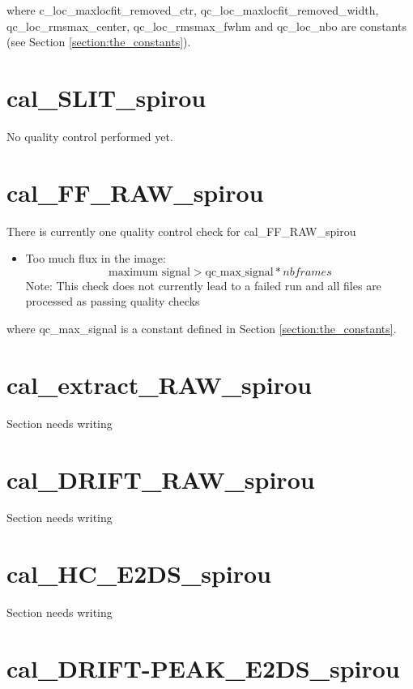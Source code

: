 \noindent where c\_loc\_maxlocfit\_removed\_ctr, qc\_loc\_maxlocfit\_removed\_width, qc\_loc\_rmsmax\_center, qc\_loc\_rmsmax\_fwhm and qc\_loc\_nbo are constants (see Section \ref{section:the_constants}).

\section{cal\_SLIT\_spirou}
\label{section:qc_cal_SLIT_spirou}

No quality control performed yet.

\section{cal\_FF\_RAW\_spirou}
\label{section:qc_cal_FF_RAW_spirou}

There is currently one quality control check for cal\_FF\_RAW\_spirou
\begin{itemize}
\item Too much flux in the image: 
	\begin{equation}
	\text{maximum signal} > \text{qc\_max\_signal} * nbframes
	\end{equation}
	\noindent Note: This check does not currently lead to a failed run and all files are processed as passing quality checks
\end{itemize}

\noindent where qc\_max\_signal is a constant defined in Section \ref{section:the_constants}.


\section{cal\_extract\_RAW\_spirou}
\label{section:qc_cal_extract_RAW_spirou}

Section needs writing

\section{cal\_DRIFT\_RAW\_spirou}
\label{section:qc_cal_DRIFT_RAW_spirou}

Section needs writing

\section{cal\_HC\_E2DS\_spirou}
\label{section:qc_cal_HC_E2DS_spirou}

Section needs writing

\section{cal\_DRIFT-PEAK\_E2DS\_spirou}
\label{section:qc_cal_DRIFT-PEAK_E2DS}

